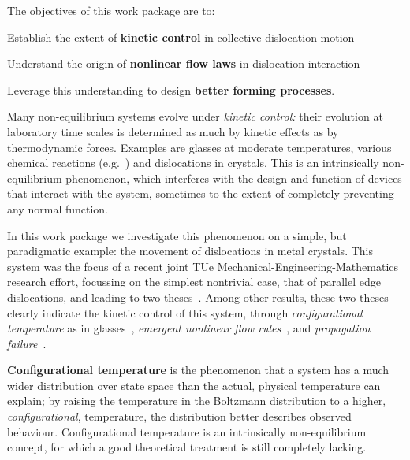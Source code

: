 \begin{workpackage}[id=WPkinetic,wphases=0-48,
short=Kin. control,
title=Kinetic control,
lead=TUE,
TUERM=36]

\begin{wpobjectives}
The objectives of this work package are to:
\begin{compactitem}
\item Establish the extent of \textbf{kinetic control} in collective dislocation motion
\item Understand the origin of \textbf{nonlinear flow laws} in dislocation interaction
\item Leverage this understanding to design \textbf{better forming processes}.
\end{compactitem}
\end{wpobjectives}

\begin{wpdescription}
Many non-equilibrium systems evolve under \emph{kinetic control:} their evolution at
laboratory time scales is determined as much by kinetic effects as by thermodynamic
forces. Examples are glasses at moderate temperatures, various chemical reactions
(e.g.~\cite{Sykes}) and dislocations in crystals. This is an intrinsically non-equilibrium
phenomenon, which interferes with the design and function of devices that interact with the
system, sometimes to the extent of completely preventing any normal function.
  
In this work package we investigate this phenomenon on a simple, but paradigmatic example:
the movement of dislocations in metal crystals. This system was the focus of a recent joint
TUe Mechanical-Engineering-Mathematics research effort, focussing on the simplest nontrivial
case, that of parallel edge dislocations, and leading to two
theses~\cite{VanMeurs15TH,Kooiman15TH}. Among other results, these two theses clearly
indicate the kinetic control of this system, through \emph{configurational temperature} as
in glasses~\cite[Ch.~2--4]{Kooiman15TH}, \emph{emergent nonlinear flow
rules}~\cite[Ch.~6]{Kooiman15TH}, and \emph{propagation
failure}~\cite[Ch.~9]{VanMeurs15TH}.

\textbf{Configurational temperature} is the phenomenon that a system has a much wider distribution over state space than the  actual, physical temperature can explain; by raising the temperature in the Boltzmann distribution to a higher, \emph{configurational}, temperature, the distribution better describes observed behaviour. Configurational temperature is an intrinsically non-equilibrium concept, for which a good theoretical treatment is still completely lacking. 


\end{wpdescription}
\end{workpackage}
